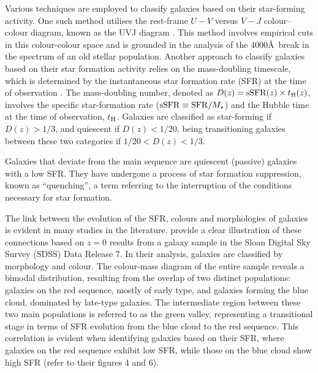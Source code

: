 \documentclass[baaa]{baaa}
\begin{document}
Various techniques are employed to classify galaxies based on their star-forming activity. One such method utilises the rest-frame $U-V$ versus $V-J$ colour–colour diagram, known as the UVJ diagram \citep[e.g.][]{Muzzin_2013}. 
This method involves empirical cuts in this colour-colour space and is grounded in the analysis of the $4000$\AA~break in the spectrum of an old stellar population.
Another approach to classify galaxies based on their star formation activity relies on 
the mass-doubling timescale, which is determined by the instantaneous star formation rate (SFR) at the time of observation \citep{Tacchella_2022}. 
The mass-doubling number, 
denoted as $D(z) = {\rm sSFR}(z) \times t_{\rm H}(z)$, 
involves the specific star-formation rate (${\rm sSFR} \equiv {\rm SFR}/M_{\star}$) 
and the Hubble time at the time of observation, $t_{\rm H}$. 
Galaxies are classified as star-forming if $D(z) > 1/3$, and quiescent if $D(z) < 1/20$, being transitioning galaxies between these two categories if $1/20 < D(z) < 1/3$. 

Galaxies that deviate from the main sequence are quiescent (passive) galaxies with a low SFR.
They have undergone a process of star formation suppression, known as ``quenching'', a term referring to the interruption of the conditions necessary for star formation.

The link between the evolution of the SFR, colours and morphologies of galaxies is evident in many studies in the literature. \cite{Schawinski_2014} provide a clear illustration of these connections based on $z = 0$ results from a galaxy sample in the Sloan Digital Sky Survey (SDSS) Data Release 7. In their analysis, galaxies are classified by morphology and colour. The colour-mass diagram of the entire sample reveals a bimodal distribution, resulting from the overlap of two distinct populations: galaxies on the red sequence, mostly of early type, and galaxies forming the blue cloud, dominated by late-type galaxies. The intermediate region between these two main populations is referred to as the green valley, representing a transitional stage in terms of SFR evolution from the blue cloud to the red sequence. This correlation is evident when identifying galaxies based on their SFR, where galaxies on the red sequence exhibit low SFR, while those on the blue cloud show high SFR (refer to their figures 4 and 6).
\end{document}

